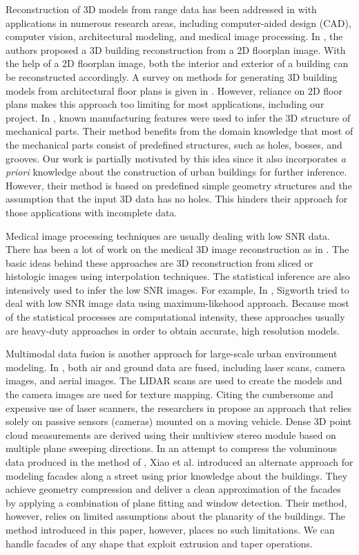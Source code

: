 Reconstruction of 3D models from range data has been addressed in
\cite{RE_Fisher,RE_CLF,RE_CD} with applications in numerous research areas,
including computer-aided design (CAD), computer vision, architectural modeling,
and medical image processing.
In \cite{DP_OWYC}, the authors proposed a 3D building reconstruction from a
2D floorplan image.
With the help of a 2D floorplan image, both the interior and exterior of a
building can be reconstructed accordingly.
A survey on methods for generating 3D building models from architectural
floor plans is given in \cite{YIN09}.
However, reliance on 2D floor plans makes this approach too limiting for
most applications, including our project.
In \cite{RE_TOGSH}, known manufacturing features were used to infer the
3D structure of mechanical parts.
Their method benefits from the domain knowledge that most of the mechanical
parts consist of predefined structures, such as holes, bosses, and grooves.
Our work is partially motivated by this idea since it also incorporates
{\it a priori} knowledge about the construction of urban buildings for further
inference.
However, their method is based on predefined simple geometry structures and
the assumption that the input 3D data has no holes.
This hinders their approach for those applications with incomplete data.

Medical image processing techniques are usually dealing with low SNR data.
There has been a lot of work on the medical 3D image reconstruction as in
\cite{MIR_FJS, MIR_BMMNB, MIR_KL, MIR_SKJ, MIR_SMHC, MIR_BVC}.
The basic ideas behind these approaches
are 3D reconstruction from sliced or histologic images using interpolation techniques.
The statistical inference are also intensively used to infer the low SNR images. For example,
In \cite{MIR_FJS}, Sigworth tried to deal with low SNR image data using maximum-likehood approach.
Because most of the statistical processes are computational intensity,
these approaches usually are heavy-duty approaches in order to obtain accurate, high resolution models.

Multimodal data fusion is another approach for large-scale urban
environment modeling.
In \cite{UM_Zakhor,UM_HYN}, both air and ground data are fused, including
laser scans, camera images, and aerial images.
The LIDAR scans are used to create the models and the camera images are used
for texture mapping.
Citing the cumbersome and expensive use of laser scanners, the researchers
in \cite{AKBARZADEH06} propose an approach that relies solely on passive
sensors (cameras) mounted on a moving vehicle.
Dense 3D point cloud measurements are derived using their multiview stereo
module based on multiple plane sweeping directions.
In an attempt to compress the voluminous data produced in the method of
\cite{AKBARZADEH06}, Xiao et al. \cite{UM_XFTQ} introduced an alternate
approach for modeling facades along a street using prior knowledge about
the buildings.
They achieve geometry compression and deliver a clean approximation of the
facades by applying a combination of plane fitting and window detection.
Their method, however, relies on limited assumptions about the planarity of
the buildings.
The method introduced in this paper, however, places no such limitations.
We can handle facades of any shape that exploit extrusion and taper operations.

